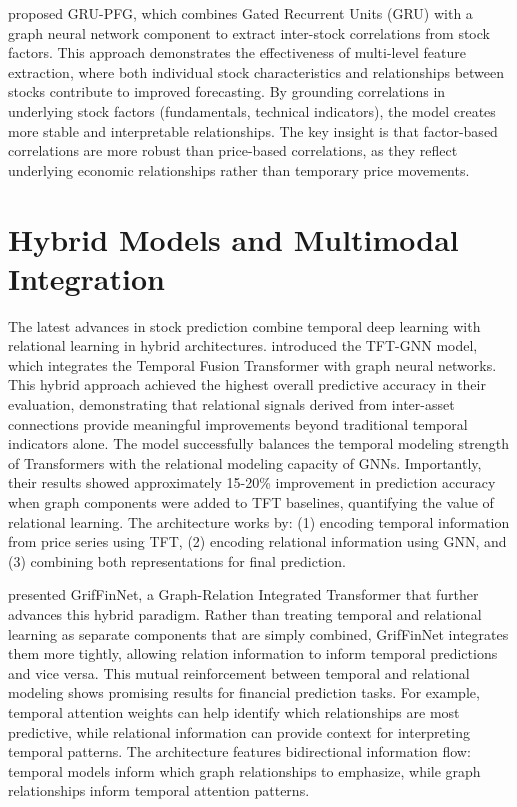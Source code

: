 \cite{zhuang2024grupfgextractinterstockcorrelation} proposed GRU-PFG, which combines Gated Recurrent Units (GRU) with a graph neural network component to extract inter-stock correlations from stock factors. This approach demonstrates the effectiveness of multi-level feature extraction, where both individual stock characteristics and relationships between stocks contribute to improved forecasting. By grounding correlations in underlying stock factors (fundamentals, technical indicators), the model creates more stable and interpretable relationships. The key insight is that factor-based correlations are more robust than price-based correlations, as they reflect underlying economic relationships rather than temporary price movements.

\section{Hybrid Models and Multimodal Integration}

The latest advances in stock prediction combine temporal deep learning with relational learning in hybrid architectures. \cite{appliedmath5040176} introduced the TFT-GNN model, which integrates the Temporal Fusion Transformer with graph neural networks. This hybrid approach achieved the highest overall predictive accuracy in their evaluation, demonstrating that relational signals derived from inter-asset connections provide meaningful improvements beyond traditional temporal indicators alone. The model successfully balances the temporal modeling strength of Transformers with the relational modeling capacity of GNNs. Importantly, their results showed approximately 15-20\% improvement in prediction accuracy when graph components were added to TFT baselines, quantifying the value of relational learning. The architecture works by: (1) encoding temporal information from price series using TFT, (2) encoding relational information using GNN, and (3) combining both representations for final prediction.

\cite{dai2025griffinnetgraphrelationintegratedtransformer} presented GrifFinNet, a Graph-Relation Integrated Transformer that further advances this hybrid paradigm. Rather than treating temporal and relational learning as separate components that are simply combined, GrifFinNet integrates them more tightly, allowing relation information to inform temporal predictions and vice versa. This mutual reinforcement between temporal and relational modeling shows promising results for financial prediction tasks. For example, temporal attention weights can help identify which relationships are most predictive, while relational information can provide context for interpreting temporal patterns. The architecture features bidirectional information flow: temporal models inform which graph relationships to emphasize, while graph relationships inform temporal attention patterns.

